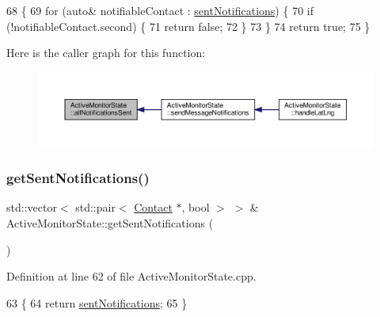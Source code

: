 \begin{DoxyCode}
68 \{
69     \textcolor{keywordflow}{for} (\textcolor{keyword}{auto}& notifiableContact : \hyperlink{class_active_monitor_state_a25493a87079926faf7d03b8587ad9f62}{sentNotifications}) \{
70         \textcolor{keywordflow}{if} (!notifiableContact.second) \{
71             \textcolor{keywordflow}{return} \textcolor{keyword}{false};
72         \}
73     \}
74     \textcolor{keywordflow}{return} \textcolor{keyword}{true};
75 \}
\end{DoxyCode}
Here is the caller graph for this function\+:
\nopagebreak
\begin{figure}[H]
\begin{center}
\leavevmode
\includegraphics[width=350pt]{d9/db8/class_active_monitor_state_add557ab0dd0774482c08c982b82395e7_icgraph}
\end{center}
\end{figure}
\mbox{\label{class_active_monitor_state_ac1d5b33105abe5bd68ed5ee0396bc3be}} 
\subsubsection{\texorpdfstring{get\+Sent\+Notifications()}{getSentNotifications()}}
{\footnotesize\ttfamily std\+::vector$<$ std\+::pair$<$ \hyperlink{class_contact}{Contact} $\ast$, bool $>$ $>$ \& Active\+Monitor\+State\+::get\+Sent\+Notifications (\begin{DoxyParamCaption}{ }\end{DoxyParamCaption})}



Definition at line 62 of file Active\+Monitor\+State.\+cpp.


\begin{DoxyCode}
63 \{
64     \textcolor{keywordflow}{return} \hyperlink{class_active_monitor_state_a25493a87079926faf7d03b8587ad9f62}{sentNotifications};
65 \}
\end{DoxyCode}
\mbox{\label{class_active_monitor_state_ab94dede8d2e407aaddb0df056f5a329c}} 
